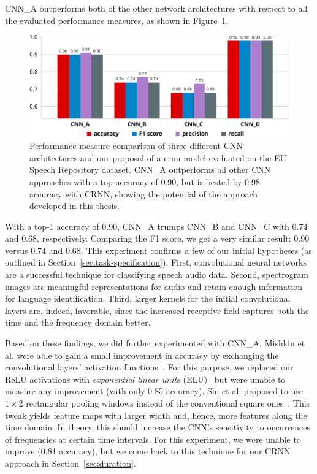 CNN\_A outperforms both of the other network architectures with respect to all the evaluated performance measures, as shown in Figure~\ref{fig:eu_results}.
%
	\begin{figure}[tp]
  		\centering
    	\includegraphics{plots/results_eu_plot-new.pdf}
    	\caption{Performance measure comparison of three different CNN architectures and our proposal of a \ac{crnn} model evaluated on the EU Speech Repository dataset. CNN\_A outperforms all other CNN approaches with a top accuracy of \num{0.90}, but is bested by \num{0.98} accuracy with CRNN, showing the potential of the approach developed in this thesis.}
    	\label{fig:eu_results}
	\end{figure}
%
With a top-1 accuracy of \num{0.90}, CNN\_A trumps CNN\_B and CNN\_C with \num{0.74} and \num{0.68}, respectively. Comparing the F1 score, we get a very similar result: \num{0.90} versus \num{0.74} and \num{0.68}. This experiment confirms a few of our initial hypotheses (as outlined in Section~\ref{sec:task-specification}). First, convolutional neural networks are a successful technique for classifying speech audio data. Second, spectrogram images are meaningful representations for audio and retain enough information for language identification. Third, larger kernels for the initial convolutional layers are, indeed, favorable, since the increased receptive field captures both the time and the frequency domain better.

Based on these findings, we did further experimented with CNN\_A. Mishkin et al. were able to gain a small improvement in accuracy by exchanging the convolutional layers' activation functions~\cite{mishkin2016systematic}. For this purpose, we replaced our ReLU activations with \emph{exponential linear units} (ELU)~\cite{clevert2015fast} but were unable to measure any improvement (with only \num{0.85} accuracy).
Shi et al. proposed to use $1 \times 2$ rectangular pooling windows instead of the conventional square ones~\cite{shi2016end}. This tweak yields feature maps with larger width and, hence, more features along the time domain. In theory, this should increase the CNN's sensitivity to occurrences of frequencies at certain time intervals. For this experiment, we were unable to improve (\num{0.81} accuracy), but we come back to this technique for our CRNN approach in Section~\ref{sec:duration}.

